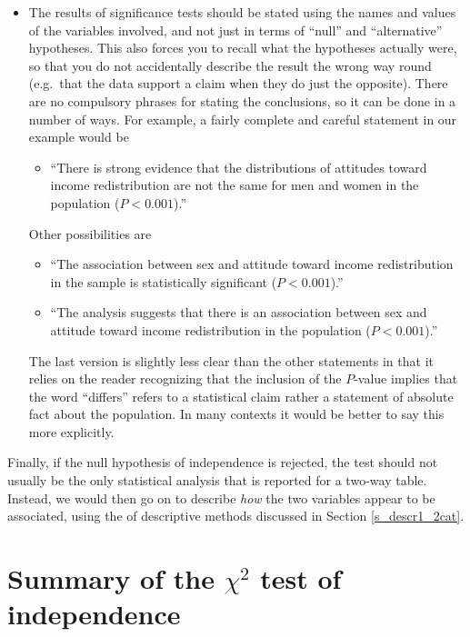 \begin{itemize}
{this course.}.
\item
The results of significance tests should be stated
using the names and values of the variables involved, and
not just in terms of
``null'' and ``alternative'' hypotheses. This also forces you
to recall what the hypotheses actually were, so that you do not
accidentally describe the
result the wrong way round (e.g.\ that the data support a claim when
they do just the opposite). There are no
compulsory phrases for stating the conclusions, so it can be done in a
number of ways. For example, a fairly complete and careful statement
in our example would be
\begin{itemize}
\item
``There is strong
evidence that the distributions of attitudes toward income
redistribution are not the same
for men and women in the population
($P<0.001$).''
\end{itemize}
Other possibilities are
\begin{itemize}
\item
``The association between sex and attitude toward income redistribution
in the sample is statistically
significant ($P<0.001$).''
\item
``The analysis suggests that there is an association
between sex and attitude toward income redistribution
in the population
($P<0.001$).''
\end{itemize}
The last version is slightly less clear than the other statements in that it relies
on the reader recognizing that the inclusion of the $P$-value implies
that the word ``differs'' refers to a statistical claim rather a
statement of absolute fact about the population. In many contexts it
would be better to say this more explicitly.
\end{itemize}
Finally, if the null hypothesis of independence is rejected, the test
should not usually be the only statistical analysis that is reported
for a two-way table. Instead, we would then go on to describe
\emph{how} the two variables appear to be associated, using the of
descriptive methods discussed in Section
\ref{s_descr1_2cat}.

\section{Summary of the $\chi^{2}$ test of independence}
\label{s_tables_summary}

